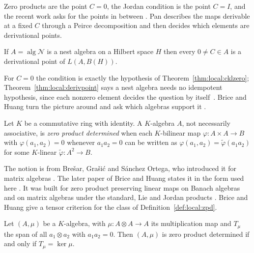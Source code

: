 Zero products are the point $C=0$, the Jordan condition is the point $C=I$,
and the recent work asks for the points in between
\cite[p.~4251]{Pan2012Derivable}. Pan describes the maps derivable at a
fixed $C$ through a Peirce decomposition
\cite[Theorem~2.1, p.~4252]{Pan2012Derivable} and then decides which
elements are derivational points.

\begin{theorem}\label{thm:local:derivpoint}
If $A=\operatorname{alg}\mathcal{N}$ is a nest algebra on a Hilbert space
$H$ then every $0\neq C\in A$ is a derivational point of $L(A,B(H))$.
\end{theorem}

For $C=0$ the condition is exactly the hypothesis of
Theorem~\ref{thm:local:cklzero}; Theorem~\ref{thm:local:derivpoint} says a
nest algebra needs no idempotent hypothesis, since each nonzero element
decides the question by itself~\cite[p.~326]{BriceHuang2015}. Brice and Huang turn the picture around and
ask which algebras support it \cite[p.~326]{BriceHuang2015}.

\begin{definition}\label{def:local:zpd}
Let $K$ be a commutative ring with identity. A $K$-algebra $A$, not
necessarily associative, is \emph{zero product determined} when each
$K$-bilinear map $\varphi\colon A\times A\to B$ with $\varphi(a_1,a_2)=0$
whenever $a_1a_2=0$ can be written as $\varphi(a_1,a_2)=\tilde{\varphi}(a_1a_2)$
for some $K$-linear $\tilde{\varphi}\colon A^2\to B$.
\end{definition}

The notion is from Bre\v{s}ar, Gra\v{s}i\'c and S\'anchez Ortega, who
introduced it for matrix algebras
\cite[pp.~1486--1498]{BresarGrasicSanchezOrtega2009}. The later paper of Brice
and Huang states it in the form
used here
\cite[pp.~326--327]{BriceHuang2015}.
It was built for zero product preserving
linear maps on Banach algebras and on matrix algebras under the standard,
Lie and Jordan products \cite[p.~327]{BriceHuang2015}.
Brice and Huang give a tensor criterion for the class of
Definition~\ref{def:local:zpd}.

\begin{theorem}\label{thm:local:zpdclass}
Let $(A,\mu)$ be a $K$-algebra, with $\mu\colon A\otimes A\to A$ its
multiplication map and $T_\mu$ the span of all $a_1\otimes a_2$ with
$a_1a_2=0$. Then $(A,\mu)$ is zero product determined if and only if
$T_\mu=\ker\mu$.
\end{theorem}

